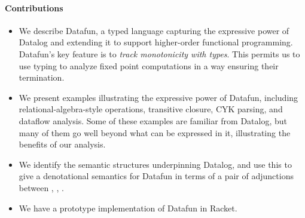 \paragraph{Contributions}
\begin{itemize}
\item We describe Datafun, a typed language capturing the expressive
  power of Datalog and extending it to support higher-order functional
  programming. Datafun's key feature is to \emph{track monotonicity
    with types}. This permits us to use typing to analyze fixed point
  computations in a way ensuring their termination.

\item We present examples illustrating the expressive power of
  Datafun, including relational-algebra-style operations, transitive
  closure, CYK parsing, and dataflow analysis. Some of these examples
  are familiar from Datalog, but many of them go well beyond what can
  be expressed in it, illustrating the benefits of our analysis.

\item We identify the semantic structures underpinning Datalog, and
  use this to give a denotational semantics for Datafun in terms of a
  pair of adjunctions between \cSet{}, \cPoset{}, \cSL{}.

\item We have a prototype implementation of Datafun in Racket. 
\end{itemize}







